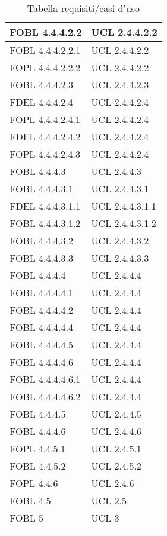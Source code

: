 \begin{longtable}{XX}
\midrule
FOBL 4.4.4.2.2&UCL 2.4.4.2.2\\
\midrule
FOBL 4.4.4.2.2.1&UCL 2.4.4.2.2\\
\midrule
FOPL 4.4.4.2.2.2&UCL 2.4.4.2.2\\
\midrule
FOBL 4.4.4.2.3&UCL 2.4.4.2.3\\
\midrule
FDEL 4.4.4.2.4&UCL 2.4.4.2.4\\
\midrule
FOPL 4.4.4.2.4.1&UCL 2.4.4.2.4\\
\midrule
FDEL 4.4.4.2.4.2&UCL 2.4.4.2.4\\
\midrule
FOPL 4.4.4.2.4.3&UCL 2.4.4.2.4\\
\midrule
FOBL 4.4.4.3&UCL 2.4.4.3\\
\midrule
FOBL 4.4.4.3.1&UCL 2.4.4.3.1\\
\midrule
FDEL 4.4.4.3.1.1&UCL 2.4.4.3.1.1\\
\midrule
FOBL 4.4.4.3.1.2&UCL 2.4.4.3.1.2\\
\midrule
FOBL 4.4.4.3.2&UCL 2.4.4.3.2\\
\midrule
FOBL 4.4.4.3.3&UCL 2.4.4.3.3\\
\midrule
FOBL 4.4.4.4&UCL 2.4.4.4\\
\midrule
FOBL 4.4.4.4.1&UCL 2.4.4.4\\
\midrule
FOBL 4.4.4.4.2&UCL 2.4.4.4\\
\midrule
FOBL 4.4.4.4.4&UCL 2.4.4.4\\
\midrule
FOBL 4.4.4.4.5&UCL 2.4.4.4\\
\midrule
FOBL 4.4.4.4.6&UCL 2.4.4.4\\
\midrule
FOBL 4.4.4.4.6.1&UCL 2.4.4.4\\
\midrule
FOBL 4.4.4.4.6.2&UCL 2.4.4.4\\
\midrule
FOBL 4.4.4.5&UCL 2.4.4.5\\
\midrule
FOBL 4.4.4.6&UCL 2.4.4.6\\
\midrule
FOPL 4.4.5.1&UCL 2.4.5.1\\
\midrule
FOBL 4.4.5.2&UCL 2.4.5.2\\
\midrule
FOPL 4.4.6&UCL 2.4.6\\
\midrule
FOBL 4.5&UCL 2.5\\
\midrule
FOBL 5&UCL 3\\ 
\bottomrule
\caption{Tabella requisiti/casi d'uso}
\end{longtable}